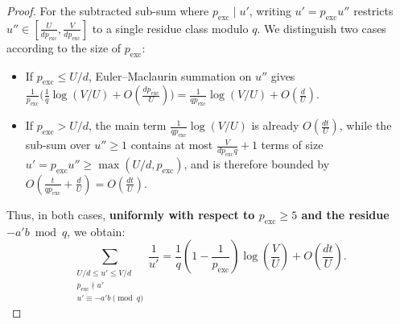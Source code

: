 \documentclass[11pt, a4paper]{article}
\theoremstyle{plain}
\theoremstyle{definition}
\begin{document}
\begin{proof}
For the subtracted sub-sum where $p_{\mathrm{exc}} \mid u'$, writing $u' = p_{\mathrm{exc}} u''$ restricts $u'' \in [\frac{U}{d p_{\mathrm{exc}}}, \frac{V}{d p_{\mathrm{exc}}}]$ to a single residue class modulo $q$. We distinguish two cases according to the size of $p_{\mathrm{exc}}$:
\begin{itemize}
    \item If $p_{\mathrm{exc}} \le U/d$, Euler--Maclaurin summation on $u''$ gives $\frac{1}{p_{\mathrm{exc}}}\big(\frac{1}{q}\log(V/U) + O(\frac{d p_{\mathrm{exc}}}{U})\big) = \frac{1}{q p_{\mathrm{exc}}}\log(V/U) + O(\frac{d}{U})$.
    \item If $p_{\mathrm{exc}} > U/d$, the main term $\frac{1}{q p_{\mathrm{exc}}}\log(V/U)$ is already $O(\frac{d t}{U})$, while the sub-sum over $u'' \ge 1$ contains at most $\frac{V}{d p_{\mathrm{exc}} q} + 1$ terms of size $u' = p_{\mathrm{exc}} u'' \ge \max(U/d, p_{\mathrm{exc}})$, and is therefore bounded by $O(\frac{t}{q p_{\mathrm{exc}}} + \frac{d}{U}) = O(\frac{d t}{U})$.
\end{itemize}
Thus, in both cases, \textbf{uniformly with respect to $p_{\mathrm{exc}} \ge 5$ and the residue $-a'b \bmod q$}, we obtain:
\[
\sum_{\substack{U/d \le u' \le V/d \\ p_{\mathrm{exc}} \nmid u' \\ u' \equiv -a'b \pmod q}} \frac{1}{u'} = \frac{1}{q}\left(1 - \frac{1}{p_{\mathrm{exc}}}\right)\log\!\left(\frac{V}{U}\right) + O\!\left(\frac{d t}{U}\right).
\]


\end{proof}
\end{document}
